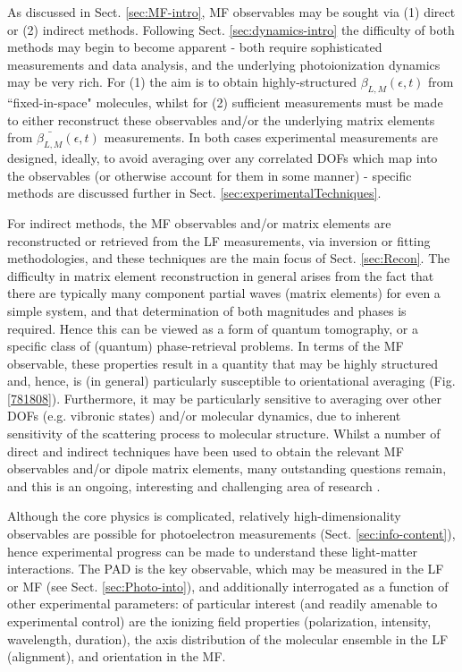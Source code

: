 \documentclass[10pt]{article}
\begin{document}
As discussed in Sect. \ref{sec:MF-intro}, MF observables may be sought via (1) direct or (2) indirect methods. Following Sect. \ref{sec:dynamics-intro} the difficulty of both methods may begin to become apparent - both require sophisticated measurements and data analysis, and the underlying photoionization dynamics may be very rich. For (1) the aim is to obtain highly-structured $\beta_{L,M}(\epsilon,t)$ from ``fixed-in-space" molecules, whilst for (2) sufficient measurements must be made to either reconstruct these observables and/or the underlying matrix elements from $\bar{\beta_{L,M}}(\epsilon,t)$ measurements. In both cases experimental measurements are designed, ideally, to avoid averaging over any correlated DOFs which map into the observables (or otherwise account for them in some manner) - specific methods are discussed further in Sect. \ref{sec:experimentalTechniques}.

For indirect methods, the MF observables and/or matrix elements are reconstructed or retrieved from the LF measurements, via inversion or fitting methodologies, and these techniques are the main focus of Sect. \ref{sec:Recon}. The difficulty in matrix element reconstruction in general arises from the fact that there are typically many component partial waves (matrix elements) for even a simple system, and that determination of both magnitudes and phases is required. Hence this can be viewed as a form of quantum tomography, or a specific class of (quantum) phase-retrieval problems. In terms of the MF observable, these properties result in a quantity that may be highly structured and, hence, is (in general) particularly susceptible to orientational averaging (Fig. \ref{781808}). Furthermore, it may be particularly sensitive to averaging over other DOFs (e.g. vibronic states) and/or molecular dynamics, due to inherent sensitivity of the scattering process to molecular structure. Whilst a number of direct and indirect techniques have been used to obtain the relevant MF observables and/or dipole matrix elements, many outstanding questions remain, and this is an ongoing, interesting and challenging area of research \cite{hockett2018QMP1, hockett2018QMP2}.

Although the core physics is complicated, relatively high-dimensionality observables are possible for photoelectron measurements (Sect. \ref{sec:info-content}), hence experimental progress can be made to understand these light-matter interactions. The PAD is the key observable, which may be measured in the LF or MF (see Sect. \ref{sec:Photo-into}), and additionally interrogated as a function of other experimental parameters: of particular interest (and readily amenable to experimental control) are the ionizing field properties (polarization, intensity, wavelength, duration), the axis distribution of the molecular ensemble in the LF (alignment), and orientation in the MF. 
\end{document}

